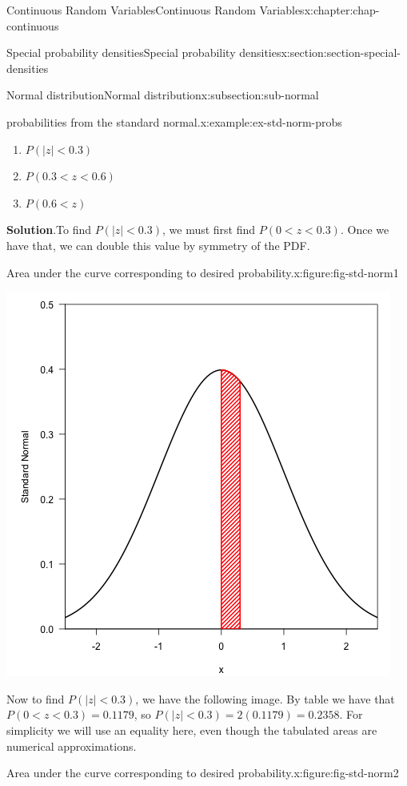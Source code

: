 \documentclass[oneside,10pt,]{book}
\newcommand{\blocktitlefont}{\relax}
\numberwithin{equation}{section}
\newcommand{\lt}{<}
\begin{document}
\begin{chapterptx}{Continuous Random Variables}{}{Continuous Random Variables}{}{}{x:chapter:chap-continuous}
\begin{sectionptx}{Special probability densities}{}{Special probability densities}{}{}{x:section:section-special-densities}
\begin{subsectionptx}{Normal distribution}{}{Normal distribution}{}{}{x:subsection:sub-normal}
\begin{example}{probabilities from the standard normal.}{x:example:ex-std-norm-probs}
\begin{enumerate}
\item{}\(\displaystyle P(|z|\lt 0.3)\)%
\item{}\(\displaystyle P(0.3 \lt z \lt 0.6)\)%
\item{}\(\displaystyle P(0.6 \lt z)\)%
\end{enumerate}
%
\textbf{\blocktitlefont Solution}.\quad{}To find \(P(|z|\lt 0.3)\), we must first find \(P(0 \lt z \lt
0.3)\). Once we have that, we can double this value by symmetry of the PDF.%
\begin{figureptx}{Area under the curve corresponding to desired probability.}{x:figure:fig-std-norm1}{}%
\begin{image}{0.25}{0.5}{0.25}%
\includegraphics[width=\linewidth]{./images/std_norm1.png}
\end{image}%
\tcblower
\end{figureptx}%
Now to find \(P(|z|\lt 0.3)\), we have the following image. By table we have that \(P(0 \lt z \lt 0.3) = 0.1179\), so \(P(|z|\lt 0.3) = 2(0.1179) = 0.2358\).  For simplicity we will use an equality here, even though the tabulated areas are numerical approximations.%
\begin{figureptx}{Area under the curve corresponding to desired probability.}{x:figure:fig-std-norm2}{}%
\begin{image}{0.25}{0.5}{0.25}%

\end{image}
\end{figureptx}
\end{example}
\end{subsectionptx}
\end{sectionptx}
\end{chapterptx}
\end{document}
